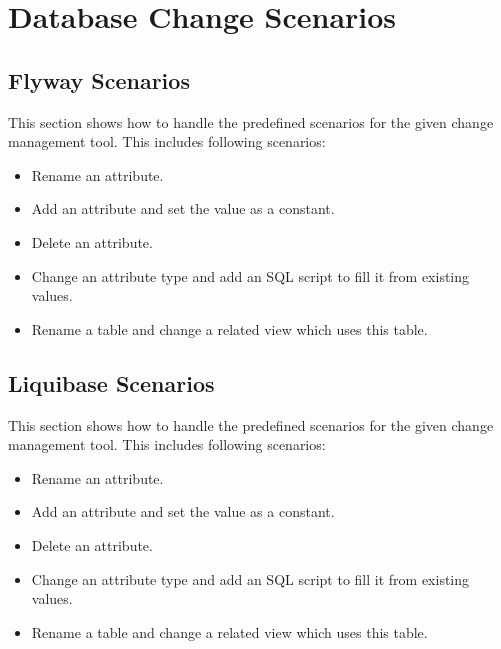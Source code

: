 

\chapter{Database Change Scenarios}
\section{Flyway Scenarios}
This section shows how to handle the predefined scenarios for the given change management tool. This includes following scenarios: 

\begin{itemize}
    \item Rename an attribute.
    \item Add an attribute and set the value as a constant.
    \item Delete an attribute.
    \item Change an attribute type and add an SQL script to fill it from existing values.
    \item Rename a table and change a related view which uses this table.
\end{itemize}


\section{Liquibase Scenarios}
This section shows how to handle the predefined scenarios for the given change management tool. This includes following scenarios: 

\begin{itemize}
    \item Rename an attribute.
    \item Add an attribute and set the value as a constant.
    \item Delete an attribute.
    \item Change an attribute type and add an SQL script to fill it from existing values.
    \item Rename a table and change a related view which uses this table.
\end{itemize}


\newpage